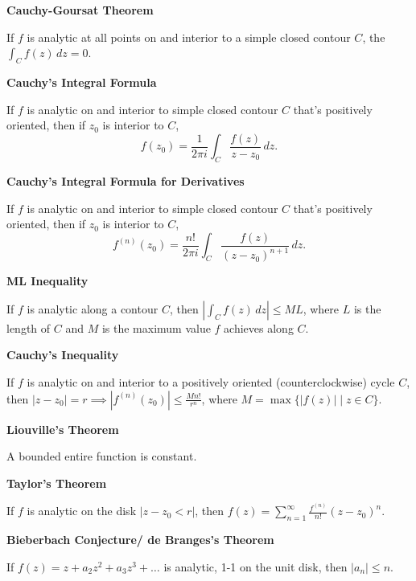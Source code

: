 \documentclass{article}
\begin{document}
\medskip\noindent\textbf{Cauchy-Goursat Theorem}

    If $f$ is analytic at all points on and interior to a simple closed contour $C$, the  $\int_Cf(z)\,dz=0$.

\medskip\noindent\textbf{Cauchy's Integral Formula}

    If $f$ is analytic on and interior to simple closed contour $C$ that's positively oriented, then if $z_0$ is interior to $C$, $$f(z_0) = \frac1{2\pi i}\int_C\frac{f(z)}{z-z_0}\,dz.$$

\medskip\noindent\textbf{Cauchy's Integral Formula for Derivatives}

    If $f$ is analytic on and interior to simple closed contour $C$ that's positively oriented, then if $z_0$ is interior to $C$, $$f^{(n)}(z_0) = \frac{n!}{2\pi i}\int_C\frac{f(z)}{(z-z_0)^{n+1}}\,dz.$$

\medskip\noindent\textbf{ML Inequality}

    If $f$ is analytic along a contour $C$, then $\left|\int_C f(z) \, dz\right| \leq ML$, where $L$ is the length of $C$ and $M$ is the maximum value $f$ achieves along $C$.

\medskip\noindent\textbf{Cauchy's Inequality}

    If $f$ is analytic on and interior to a positively oriented (counterclockwise) cycle $C$, then $|z-z_0| = r \implies |f^{(n)}(z_0)| \leq \frac{Mn!}{r^n}$, where $M = \max\{|f(z)| \mid z \in C\}$.

\medskip\noindent\textbf{Liouville's Theorem}

    A bounded entire function is constant.

\medskip\noindent\textbf{Taylor's Theorem}

    If $f$ is analytic on the disk $|z-z_0 < r|$, then $f(z) = \sum_{n=1}^\infty\frac{f^{(n)}}{n!}(z-z_0)^n$.

\medskip\noindent\textbf{Bieberbach Conjecture/ de Branges's Theorem}

    If $f(z) = z + a_2z^2 + a_3z^3 + \hdots$ is analytic, 1-1 on the unit disk, then $|a_n| \leq n$.
\end{document}
